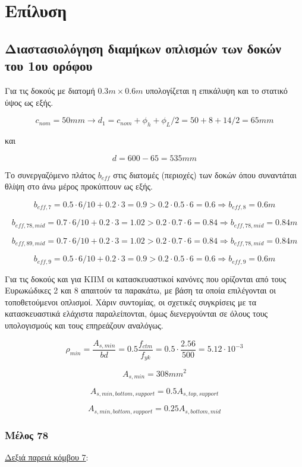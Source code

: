 \pagestyle{fancy}
\chapter{Επίλυση}
\section{Διαστασιολόγηση διαμήκων οπλισμών των δοκών του 1ου ορόφου}
\noindent
Για τις δοκούς με διατομή $0.3m\times0.6m$ υπολογίζεται η επικάλυψη και το στατικό ύψος ως εξής.

\[
c_{nom} = 50 mm \rightarrow d_1 = c_{nom} + \phi_h + \phi_L/2 = 50 + 8 + 14/2 = 65 mm
\]

\noindent
και

\[
d = 600 - 65 = 535 mm
\]

\noindent
Το συνεργαζόμενο πλάτος \(b_{eff}\) στις διατομές (περιοχές) των δοκών όπου συναντάται θλίψη στο άνω μέρος προκύπτουν ως εξής.

\[
b_{eff,7} = 0.5\cdot6/10 + 0.2\cdot3 = 0.9 > 0.2\cdot0.5\cdot6 = 0.6 \Rightarrow b_{eff,8} = 0.6m
\]

\[
b_{eff,78,mid} = 0.7\cdot6/10 + 0.2\cdot3 = 1.02 > 0.2\cdot0.7\cdot6 = 0.84 \Rightarrow b_{eff,78,mid} = 0.84m
\]

\[
b_{eff,89,mid} = 0.7\cdot6/10 + 0.2\cdot3 = 1.02 > 0.2\cdot0.7\cdot6 = 0.84 \Rightarrow b_{eff,78,mid} = 0.84m
\]

\[
b_{eff,9} = 0.5\cdot6/10 + 0.2\cdot3 = 0.9 > 0.2\cdot0.5\cdot6 = 0.6 \Rightarrow b_{eff,9} = 0.6m
\]

\noindent
Για τις δοκούς και για ΚΠΜ οι κατασκευαστικοί κανόνες που ορίζονται από τους Ευρωκώδικες 2 και 8 απαιτούν τα παρακάτω, με βάση τα οποία επιλέγονται οι τοποθετούμενοι οπλισμοί. Χάριν συντομίας, οι σχετικές συγκρίσεις με τα κατασκευαστικά ελάχιστα παραλείπονται, όμως διενεργούνται σε όλους τους υπολογισμούς και τους επηρεάζουν αναλόγως.

\[
\rho_{min} = \dfrac{A_{s,min}}{bd} = 0.5\dfrac{f_{ctm}}{f_{yk}} = 0.5\cdot \dfrac{2.56}{500} = 5.12\cdot 10^{-3}
\]

\[
A_{s,min} = 308mm^2
\]

\[
A_{s,min,bottom,support} = 0.5A_{s,top,support}
\]

\[
A_{s,min,bottom,support} = 0.25A_{s,bottom,mid}
\]

\subsection{Μέλος 78}
\noindent
\underline{Δεξιά παρειά κόμβου 7}:

